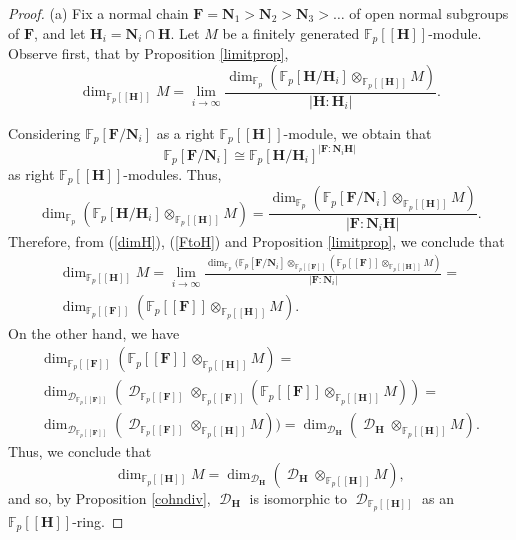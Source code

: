 \documentclass[11pt]{amsart}
\numberwithin{claimcounter}{lem}
\DeclareMathOperator{\D}{\mathcal D}
\newcommand{\F}{\mathbb{F}}
\begin{document}
 \begin{proof}  (a) Fix   a normal chain $\mathbf F=\mathbf N_1>\mathbf N_2>\mathbf N_3> \ldots$  of open normal subgroups of $\mathbf F$,  and let $\mathbf H_i=\mathbf N_i\cap \mathbf H$. Let $M$ be a finitely generated $\F_p[[\mathbf H]]$-module. Observe first, that by Proposition \ref{limitprop},  
\begin{equation} \label{dimH} \dim_{\F_p[[\mathbf H]]} M= \lim_{i\to \infty}\frac{\dim_{\F_p} (\F_p[\mathbf H/\mathbf H_i]\otimes_{\F_p[[ \mathbf H]]}M) }{| \mathbf H:\mathbf H_i|}. \end{equation}

Considering  $\F_p[\mathbf F/\mathbf  N_i]$ as a right $\F_p[[\mathbf H]]$-module, we obtain that 
$$ 
\F_p[\mathbf F/\mathbf  N_i]\cong   \F_p[\mathbf H/\mathbf  H_i]^{|\mathbf F:\mathbf N_i\mathbf H|}$$ as right $\F_p[[\mathbf H]]$-modules.  Thus,
\begin{equation}\label{FtoH} \dim_{\F_p} (\F_p[\mathbf H/\mathbf H_i]\otimes_{\F_p[[ \mathbf H]]} M)=\frac{\dim_{\F_p} (\F_p[\mathbf F/\mathbf N_i]\otimes_{\F_p[[\mathbf H]]} M)}{|\mathbf  F:\mathbf N_i\mathbf H|}.\end{equation}
 Therefore, from (\ref{dimH}),  (\ref{FtoH}) and Proposition \ref{limitprop}, we conclude that
\begin{multline}\label{fphfpf}
 \dim_{\F_p[[\mathbf H]]} M=\lim_{i\to \infty}\frac{\dim_{\F_p}(\F_p[\mathbf F/\mathbf N_i]\otimes _{\F_p[[\mathbf F]]}(\F_p[[\mathbf F]] \otimes_{\F_p[[\mathbf H]]} M)}{|\mathbf F:\mathbf N_i|}=\\ 
 \dim _{\F_p[[\mathbf F]]}( \F_p[[\mathbf F]] \otimes_{\F_p[[\mathbf H]]} M).\end{multline}
 On the other hand, we have
 \begin{multline*}
\dim _{\F_p[[\mathbf F]]}( \F_p[[\mathbf F]] \otimes_{\F_p[[\mathbf H]]} M)=\\ \dim_{\D_{\F_p[[\mathbf F]]}} (\D_{\F_p[[\mathbf F]]}\otimes_{\F_p[[\mathbf F]]}( \F_p[[\mathbf F]] \otimes_{\F_p[[\mathbf H]]} M))=\\
\dim_{\D_{\F_p[[\mathbf F]]}} (\D_{\F_p[[\mathbf F]]}\otimes_{\F_p[[\mathbf H]]} M))=\dim_{\D_\mathbf H} (\D_\mathbf H \otimes_{\F_p[[\mathbf H]]} M) .\end{multline*}
Thus,  we conclude that $$\dim_{\F_p[[\mathbf H]]} M=\dim_{\D_\mathbf H} (\D_\mathbf H \otimes_{\F_p[[\mathbf H]]} M) ,$$ and so, by Proposition \ref{cohndiv}, $\D_\mathbf H$ is isomorphic to $\D_{\F_p[[\mathbf H]]}$ 
as an $\F_p[[\mathbf H]]$-ring.  


\end{proof}
\end{document}
